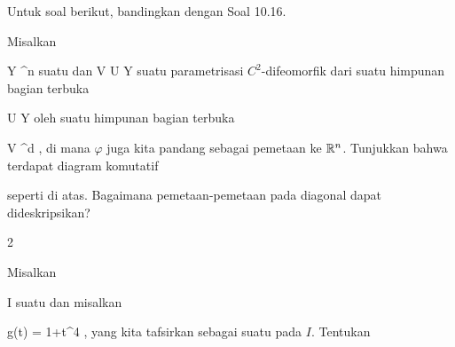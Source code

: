 Untuk soal berikut, bandingkan dengan
Soal 10.16.

{}
{

Misalkan

\mavergleichskette
{\vergleichskette
{ Y
}
{ \subseteq }{ \R^n
}
{  }{
}
{    }{
}
{   }{
}
}
{}{}{}
suatu
dan
\maabb {\varphi} { V } { U \subseteq Y
} {}
suatu parametrisasi $C^2$-difeomorfik dari suatu himpunan bagian terbuka

\mavergleichskette
{\vergleichskette
{ U
}
{ \subseteq }{ Y
}
{  }{
}
{    }{
}
{   }{
}
}
{}{}{}
oleh suatu himpunan bagian terbuka

\mavergleichskette
{\vergleichskette
{ V
}
{ \subseteq }{ \R^d
}
{  }{
}
{    }{
}
{   }{
}
}
{}{}{,}
di mana $\varphi$ juga kita pandang sebagai pemetaan ke ${\mathbb R}^n$. Tunjukkan bahwa terdapat diagram komutatif

 {  }

seperti di atas. Bagaimana pemetaan-pemetaan pada diagonal dapat dideskripsikan?

}
{} {}


{2}
{

Misalkan

\mavergleichskette
{\vergleichskette
{ I
}
{ \subseteq }{ \R
}
{  }{
}
{    }{
}
{   }{
}
}
{}{}{}
suatu
dan misalkan

\mavergleichskettedisp
{\vergleichskette
{ g(t)
}
{ =} { 1+t^4
}
{ } {
}
{ } {
}
{ } {
}
}
{}{}{,}
yang kita tafsirkan sebagai suatu
pada $I$. Tentukan
 {} {}


}
{} {}

